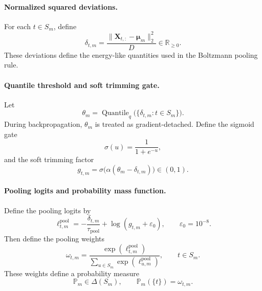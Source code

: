 \documentclass{article}
\theoremstyle{plain}
\theoremstyle{definition}
\theoremstyle{remark}
\begin{document}
\paragraph{Normalized squared deviations.}
For each $t\in S_m$, define
\begin{equation}
\label{eq:normalized-deviation}
\delta_{t,m}=\frac{\|\mathbf X_{t,:}-\boldsymbol\mu_m\|_2^2}{D}\in\mathbb R_{\ge 0}.
\end{equation}
These deviations define the energy-like quantities used in the Boltzmann pooling rule.

\paragraph{Quantile threshold and soft trimming gate.}
Let
\begin{equation}
\label{eq:trimming-threshold}
\theta_m=\operatorname{Quantile}_q\bigl(\{\delta_{t,m}:t\in S_m\}\bigr).
\end{equation}
During backpropagation, $\theta_m$ is treated as gradient-detached. Define the sigmoid gate
\begin{equation}
\label{eq:sigmoid}
\sigma(u)=\frac{1}{1+e^{-u}},
\end{equation}
and the soft trimming factor
\begin{equation}
\label{eq:trimming-gate}
g_{t,m}=\sigma\bigl(\alpha(\theta_m-\delta_{t,m})\bigr)\in(0,1).
\end{equation}

\paragraph{Pooling logits and probability mass function.}
Define the pooling logits by
\begin{equation}
\label{eq:pooling-logits}
\ell^{\mathrm{pool}}_{t,m}=-\frac{\delta_{t,m}}{\tau_{\mathrm{pool}}}+\log(g_{t,m}+\varepsilon_0),
\qquad
\varepsilon_0=10^{-8}.
\end{equation}
Then define the pooling weights
\begin{equation}
\label{eq:pooling-weights}
\omega_{t,m}=\frac{\exp(\ell^{\mathrm{pool}}_{t,m})}{\sum_{u\in S_m}\exp(\ell^{\mathrm{pool}}_{u,m})},
\qquad t\in S_m.
\end{equation}
These weights define a probability measure
\begin{equation}
\label{eq:pooling-pmf}
\mathbb P_m\in\Delta(S_m),
\qquad
\mathbb P_m(\{t\})=\omega_{t,m}.
\end{equation}
\end{document}
